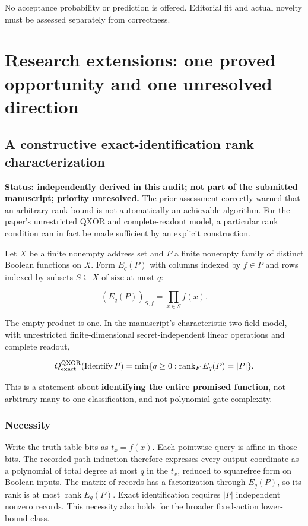 \documentclass[
  11pt,
]{article}
\begin{document}
No acceptance probability or prediction is offered. Editorial fit and
actual novelty must be assessed separately from correctness.

\section{Research extensions: one proved opportunity and one unresolved
direction}\label{research-extensions-one-proved-opportunity-and-one-unresolved-direction}

\subsection{A constructive exact-identification rank
characterization}\label{a-constructive-exact-identification-rank-characterization}

\textbf{Status: independently derived in this audit; not part of the
submitted manuscript; priority unresolved.} The prior assessment
correctly warned that an arbitrary rank bound is not automatically an
achievable algorithm. For the paper's unrestricted QXOR and
complete-readout model, a particular rank condition can in fact be made
sufficient by an explicit construction.

Let \(X\) be a finite nonempty address set and \(P\) a finite nonempty
family of distinct Boolean functions on \(X\). Form \(E_q(P)\) with
columns indexed by \(f\in P\) and rows indexed by subsets
\(S\subseteq X\) of size at most \(q\):

\[
(E_q(P))_{S,f}=\prod_{x\in S}f(x).
\]

The empty product is one. In the manuscript's characteristic-two field
model, with unrestricted finite-dimensional secret-independent linear
operations and complete readout,

\[
Q_{\rm exact}^{\rm QXOR}(\operatorname{Identify}P)
=\min\{q\ge0:\operatorname{rank}_F E_q(P)=|P|\}.
\]

This is a statement about \textbf{identifying the entire promised
function}, not arbitrary many-to-one classification, and not polynomial
gate complexity.

\subsubsection{Necessity}\label{necessity}

Write the truth-table bits as \(t_x=f(x)\). Each pointwise query is
affine in those bits. The recorded-path induction therefore expresses
every output coordinate as a polynomial of total degree at most \(q\) in
the \(t_x\), reduced to squarefree form on Boolean inputs. The matrix of
records has a factorization through \(E_q(P)\), so its rank is at most
\(\operatorname{rank}E_q(P)\). Exact identification requires \(|P|\)
independent nonzero records. This necessity also holds for the broader
fixed-action lower-bound class.
\end{document}
